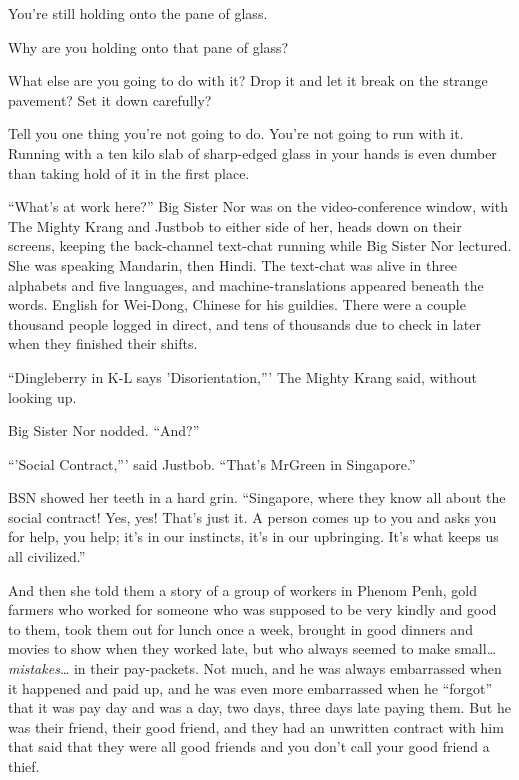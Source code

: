 You're still holding onto the pane of glass.

Why are you holding onto that pane of glass?

What else are you going to do with it? Drop it and let it break on
the strange pavement? Set it down carefully?

Tell you one thing you're not going to do. You're not going to run
with it. Running with a ten kilo slab of sharp-edged glass in your
hands is even dumber than taking hold of it in the first place.

\tb

``What's at work here?'' Big Sister Nor was on the video-conference
window, with The Mighty Krang and Justbob to either side of her,
heads down on their screens, keeping the back-channel text-chat
running while Big Sister Nor lectured. She was speaking Mandarin,
then Hindi. The text-chat was alive in three alphabets and five
languages, and machine-translations appeared beneath the words.
English for Wei-Dong, Chinese for his guildies. There were a couple
thousand people logged in direct, and tens of thousands due to
check in later when they finished their shifts.

``Dingleberry in K-L says 'Disorientation,''' The Mighty Krang said,
without looking up.

Big Sister Nor nodded. ``And?''

``'Social Contract,''' said Justbob. ``That's MrGreen in Singapore.''

BSN showed her teeth in a hard grin. ``Singapore, where they know
all about the social contract! Yes, yes! That's just it. A person
comes up to you and asks you for help, you help; it's in our
instincts, it's in our upbringing. It's what keeps us all
civilized.''

And then she told them a story of a group of workers in Phenom
Penh, gold farmers who worked for someone who was supposed to be
very kindly and good to them, took them out for lunch once a week,
brought in good dinners and movies to show when they worked late,
but who always seemed to make small\ldots{} \emph{mistakes}\ldots{} in their
pay-packets. Not much, and he was always embarrassed when it
happened and paid up, and he was even more embarrassed when he
``forgot'' that it was pay day and was a day, two days, three days
late paying them. But he was their friend, their good friend, and
they had an unwritten contract with him that said that they were
all good friends and you don't call your good friend a thief.

